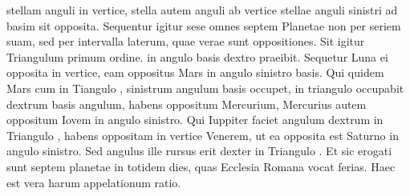 stellam anguli in vertice, stella autem anguli ab vertice stellae
anguli sinistri ad basim sit opposita.
%
Sequentur igitur sese omnes septem
Planetae non per seriem suam, sed per intervalla laterum, quae
verae sunt oppositiones.
Sit igitur Triangulum  primum ordine.
 in angulo basis dextro praeibit.
Sequetur Luna ei opposita in vertice,
eam oppositus Mars in angulo sinistro basis.
Qui quidem Mars cum in
Tiangulo , sinistrum angulum basis occupet,
 in triangulo  occupabit
dextrum basis angulum, habens oppositum Mercurium,
Mercurius autem oppositum Iovem in angulo sinistro.
Qui Iuppiter
faciet angulum dextrum in Triangulo , habens oppositam in vertice
Venerem, ut ea opposita est Saturno in angulo sinistro.
Sed angulus
ille rursus erit dexter in Triangulo .
Et sic erogati sunt septem
planetae in totidem dies, quas Ecclesia Romana vocat ferias.
Haec est vera harum appelationum ratio.
